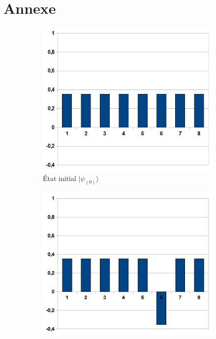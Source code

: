 \clearpage
\section{Annexe}
\begin{figure}[ht!]
    \centering
        \begin{subfigure}[b]{0.40\textwidth}
            \includegraphics[width=\textwidth]{Grover-EtatInitial.jpg}
            \caption{\footnotesize État initial $|\psi_{(0)}\rangle$}
            \label{fig2:first}
        \end{subfigure}
        \hspace{1cm}
        \begin{subfigure}[b]{0.40\textwidth}
            \includegraphics[width=\textwidth]{Grover-PassageParBoiteNoire.jpg}

\end{subfigure}
\end{figure}
